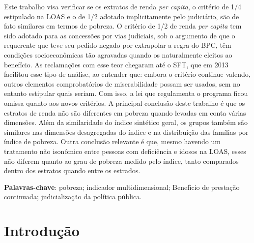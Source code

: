 \documentclass[
	12pt,				%
	openright,			%
	twoside,			%
	a4paper,			%
	english,			%
	french,				%
	spanish,			%
	brazil				%
	]{abntex2}
\begin{document}
\setlength{\absparsep}{18pt} %
\begin{resumo}
 Este trabalho visa verificar se os extratos de renda \textit{per capita}, o critério de 1/4 estipulado na LOAS e o de 1/2 adotado implicitamente pelo judiciário, são de fato similares em termos de pobreza. O critério de 1/2 de renda \textit{per capita} tem sido adotado para as concessões por vias judiciais, sob o argumento de que o requerente que teve seu pedido negado por extrapolar a regra do BPC, têm condições socioeconômicas tão agravadas quando os naturalmente eleitos ao benefício. As reclamações com esse teor chegaram até o SFT, que em 2013 facilitou esse tipo de análise, ao entender que: embora o critério continue valendo, outros elementos comprobatórios de miserabilidade possam ser usados, sem no entanto estipular quais seriam. Com isso, a lei que regulamenta o programa ficou omissa quanto aos novos critérios. A principal conclusão deste trabalho é que os estratos de renda não são diferentes em pobreza quando levadas em conta várias dimensões. Além da similaridade do índice sintético geral, os grupos também são similares nas dimensões desagregadas do índice e na distribuição das famílias por índice de pobreza. Outra conclusão relevante é que, mesmo havendo um tratamento não isonômico entre pessoas com deficiência e idosos na LOAS, esses não diferem quanto ao grau de pobreza medido pelo índice, tanto comparados dentro dos estratos quando entre os estrados.


 \textbf{Palavras-chave}: pobreza; indicador multidimensional; Benefício de prestação continuada; judicialização  da  política  pública.
\end{resumo}


\listoffigures*
\cleardoublepage

\listoftables*
\cleardoublepage

\tableofcontents*
\cleardoublepage



\textual

\chapter{Introdução}
\end{document}
